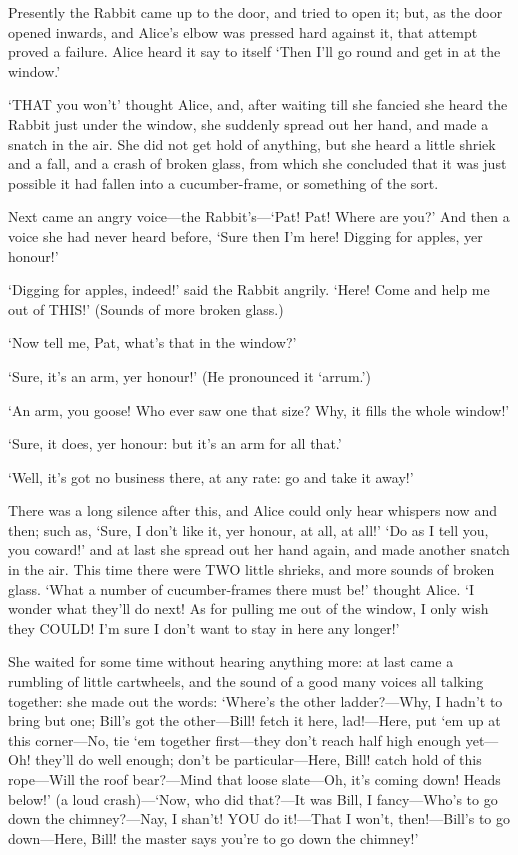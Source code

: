 \documentclass[12pt]{article}
\begin{document}
\begin{Parallel}[p]{}{}
{Presently the Rabbit came up to the door, and tried to open it; but, as the door opened inwards, and Alice’s elbow was pressed hard against it, that attempt proved a failure. Alice heard it say to itself ‘Then I’ll go round and get in at the window.’

‘THAT you won’t’ thought Alice, and, after waiting till she fancied she heard the Rabbit just under the window, she suddenly spread out her hand, and made a snatch in the air. She did not get hold of anything, but she heard a little shriek and a fall, and a crash of broken glass, from which she concluded that it was just possible it had fallen into a cucumber-frame, or something of the sort.

Next came an angry voice—the Rabbit’s—‘Pat! Pat! Where are you?’ And then a voice she had never heard before, ‘Sure then I’m here! Digging for apples, yer honour!’

‘Digging for apples, indeed!’ said the Rabbit angrily. ‘Here! Come and help me out of THIS!’ (Sounds of more broken glass.)

‘Now tell me, Pat, what’s that in the window?’

‘Sure, it’s an arm, yer honour!’ (He pronounced it ‘arrum.’)

‘An arm, you goose! Who ever saw one that size? Why, it fills the whole window!’

‘Sure, it does, yer honour: but it’s an arm for all that.’

‘Well, it’s got no business there, at any rate: go and take it away!’

There was a long silence after this, and Alice could only hear whispers now and then; such as, ‘Sure, I don’t like it, yer honour, at all, at all!’ ‘Do as I tell you, you coward!’ and at last she spread out her hand again, and made another snatch in the air. This time there were TWO little shrieks, and more sounds of broken glass. ‘What a number of cucumber-frames there must be!’ thought Alice. ‘I wonder what they’ll do next! As for pulling me out of the window, I only wish they COULD! I’m sure I don’t want to stay in here any longer!’

She waited for some time without hearing anything more: at last came a rumbling of little cartwheels, and the sound of a good many voices all talking together: she made out the words: ‘Where’s the other ladder?—Why, I hadn’t to bring but one; Bill’s got the other—Bill! fetch it here, lad!—Here, put ‘em up at this corner—No, tie ‘em together first—they don’t reach half high enough yet—Oh! they’ll do well enough; don’t be particular—Here, Bill! catch hold of this rope—Will the roof bear?—Mind that loose slate—Oh, it’s coming down! Heads below!’ (a loud crash)—‘Now, who did that?—It was Bill, I fancy—Who’s to go down the chimney?—Nay, I shan’t! YOU do it!—That I won’t, then!—Bill’s to go down—Here, Bill! the master says you’re to go down the chimney!’

}
\end{Parallel}
\end{document}
